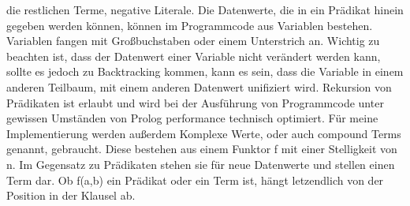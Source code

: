 die restlichen Terme, negative Literale.
Die Datenwerte, die in ein Prädikat hinein gegeben werden können, können im Programmcode aus Variablen bestehen.
Variablen fangen mit Großbuchstaben oder einem Unterstrich an. Wichtig zu beachten ist, dass der Datenwert einer Variable
nicht verändert werden kann, sollte es jedoch zu Backtracking kommen, kann es sein, dass die Variable in einem anderen Teilbaum,
mit einem anderen Datenwert unifiziert wird.
Rekursion von Prädikaten ist erlaubt und wird bei der Ausführung von Programmcode unter gewissen Umständen von Prolog performance technisch
optimiert.
Für meine Implementierung werden außerdem Komplexe Werte, oder auch compound Terms genannt, gebraucht.
Diese bestehen aus einem Funktor f mit einer Stelligkeit von n.
Im Gegensatz zu Prädikaten stehen sie für neue Datenwerte und stellen einen Term dar.
Ob f(a,b) ein Prädikat oder ein Term ist, hängt letzendlich von der Position in der Klausel ab.

